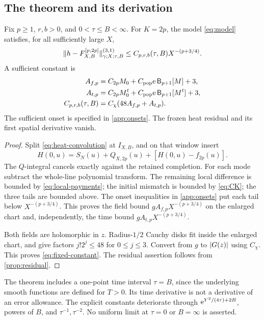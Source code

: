 \subsection{The theorem and its derivation}
\begin{theorem}
\label{thm:fixed}
Fix \(p\ge1\), \(r,b>0\), and \(0<\tau\le B<\infty\).
For \(K=2p\), the model \eqref{eq:model} satisfies, for all
sufficiently large \(X\),
\begin{equation}
 \lVert h-F_{X,B}^{[p,2p]}\rVert_{\gamma;X;\tau,B}^{(3,1)}
 \le C_{p,r,b}(\tau,B)X^{-(p+3/4)}.
 \label{eq:fixed-result}
\end{equation}
A sufficient constant is
\begin{subequations}\label{eq:fixed-constant}
\begin{align}
 A_{f,p}&=C_{2p}M_0+C_{\mathrm{pop}}\mathrm e\,\mathsf B_{p+1}[M]+3,\\
 A_{t,p}&=C_{2p}M_0^t+C_{\mathrm{pop}}\mathrm e\,\mathsf B_{p+1}[M^t]+3,\\
 C_{p,r,b}(\tau,B)&=C_\chi(48A_{f,p}+A_{t,p}).
\end{align}
\end{subequations}
The sufficient onset is specified in \cref{app:onsets}.
The frozen heat residual and its first spatial derivative vanish.
\end{theorem}
\begin{proof}
Split \eqref{eq:heat-convolution} at \(I_{X,B}\), and on that
window insert
\[
 H(0,u)=S_N(u)+Q_{X,2p}(u)+[H(0,u)-f_{2p}(u)].
\]
The \(Q\)-integral cancels exactly against the retained completion.
For each mode subtract the whole-line polynomial transform.
The remaining local difference is bounded by
\eqref{eq:local-payments}; the initial mismatch is bounded by
\eqref{eq:CK}; the three tails are bounded above.
The onset inequalities in \cref{app:onsets} put each tail below
\(X^{-(p+3/4)}\). This proves the field bound \(gA_{f,p}X^{-(p+3/4)}\)
on the enlarged chart and, independently, the time bound
\(gA_{t,p}X^{-(p+3/4)}\).

Both fields are holomorphic in \(z\). Radius-\(1/2\) Cauchy disks
fit inside the enlarged chart, and give factors \(j!2^j\le48\)
for \(0\le j\le3\). Convert from \(g\) to \(\lvert G(z)\rvert\)
using \(C_\chi\). This proves \eqref{eq:fixed-constant}.
The residual assertion follows from \cref{prop:residual}.
\end{proof}
The theorem includes a one-point time interval \(\tau=B\), since
the underlying smooth functions are defined for \(T>0\).
Its time derivative is not a derivative of an error allowance.
The explicit constants deteriorate through
\(\mathrm e^{Y^2/(4\tau)+2B}\), powers of \(B\), and
\(\tau^{-1},\tau^{-2}\). No uniform limit at \(\tau=0\)
or \(B=\infty\) is asserted.

